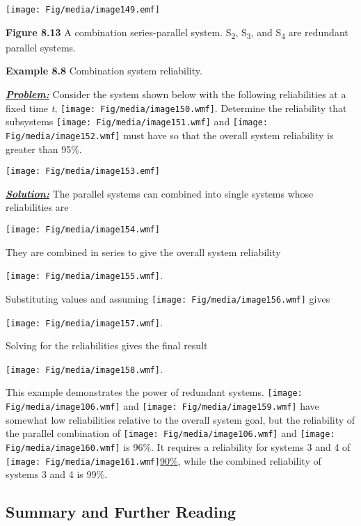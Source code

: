 \texttt{[image: Fig/media/image149.emf]}

\textbf{Figure 8.13} A combination series-parallel system.
S\textsubscript{2}, S\textsubscript{3}, and S\textsubscript{4} are
redundant parallel systems.

\textbf{Example 8.8} Combination system reliability.

\emph{\textbf{\ul{Problem:}}} Consider the system shown below with the
following reliabilities at a fixed time \emph{t},
\texttt{[image: Fig/media/image150.wmf]}. Determine the reliability that
subsystems \texttt{[image: Fig/media/image151.wmf]} and
\texttt{[image: Fig/media/image152.wmf]} must have so that the overall
system reliability is greater than 95\%.

\texttt{[image: Fig/media/image153.emf]}

\emph{\textbf{\ul{Solution:}}} The parallel systems can combined into
single systems whose reliabilities are

\texttt{[image: Fig/media/image154.wmf]}

They are combined in series to give the overall system reliability

\texttt{[image: Fig/media/image155.wmf]}.

Substituting values and assuming
\texttt{[image: Fig/media/image156.wmf]} gives

\texttt{[image: Fig/media/image157.wmf]}.

Solving for the reliabilities gives the final result

\texttt{[image: Fig/media/image158.wmf]}.

This example demonstrates the power of redundant systems.
\texttt{[image: Fig/media/image106.wmf]} and
\texttt{[image: Fig/media/image159.wmf]} have somewhat low reliabilities
relative to the overall system goal, but the reliability of the parallel
combination of \texttt{[image: Fig/media/image106.wmf]} and
\texttt{[image: Fig/media/image160.wmf]} is 96\%. It requires a
reliability for systems 3 and 4 of
\texttt{[image: Fig/media/image161.wmf]}\ul{90\%}, while the combined
reliability of systems 3 and 4 is 99\%.

\subsection{Summary and Further
Reading}\label{summary-and-further-reading}

